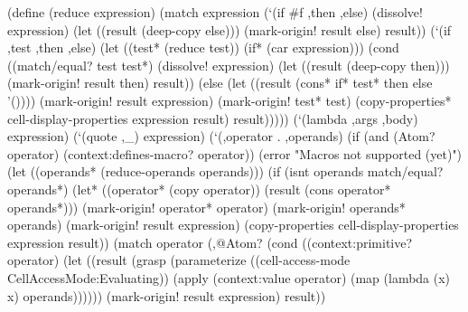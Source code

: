 \documentclass[acmsmall]{acmart}
\newenvironment{Snippet}{\Verbatim[samepage=true]}{\endVerbatim}
\begin{document}
\begin{Snippet}
  (define (reduce expression)
    (match expression
\end{Snippet}
\begin{Snippet}
      (`(if #f ,then ,else)
       (dissolve! expression)
       (let ((result (deep-copy else)))
	 (mark-origin! result else)
	 result))
\end{Snippet}
\begin{Snippet}
      (`(if ,test ,then ,else)
       (let ((test* (reduce test))
	     (if* (car expression)))
	 (cond ((match/equal? test test*)
		(dissolve! expression)
		(let ((result (deep-copy then)))
		  (mark-origin! result then)
		  result))
\end{Snippet}
\begin{Snippet}
	       (else
		(let ((result (cons* if* test* then else '())))
		  (mark-origin! result expression)
		  (mark-origin! test* test)
		  (copy-properties* cell-display-properties expression result)
		  result)))))
\end{Snippet}
\begin{Snippet}
      (`(lambda ,args ,body)
       expression)
\end{Snippet}
\begin{Snippet}
      (`(quote ,_)
       expression)
\end{Snippet}
\begin{Snippet}
      (`(,operator . ,operands)
       (if (and (Atom? operator)
		(context:defines-macro? operator))
	   (error "Macros not supported (yet)")
\end{Snippet}
\begin{Snippet}
	   (let ((operands* (reduce-operands operands)))
	     (if (isnt operands match/equal? operands*)
		 (let* ((operator* (copy operator))
			(result (cons operator* operands*)))
		   (mark-origin! operator* operator)
		   (mark-origin! operands* operands)
		   (mark-origin! result expression)
		   (copy-properties cell-display-properties expression result))
\end{Snippet}
\begin{Snippet}
		 (match operator
		   (,@Atom?		    
		    (cond ((context:primitive? operator)
			   (let ((result 
                                  (grasp
			           (parameterize ((cell-access-mode 
                                                   CellAccessMode:Evaluating))
				     (apply (context:value operator)
					    (map (lambda (x) x) operands))))))
			     (mark-origin! result expression)
			     result))
\end{Snippet}
\end{document}
